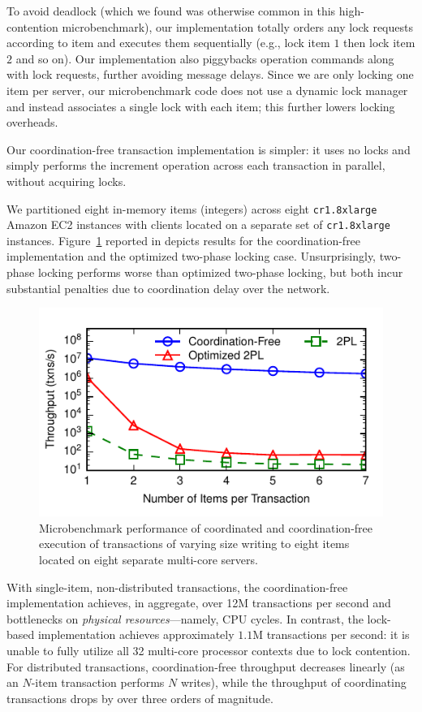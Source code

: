 To avoid deadlock (which we found was otherwise common in this
high-contention microbenchmark), our implementation totally orders any
lock requests according to item and executes them sequentially (e.g.,
lock item $1$ then lock item $2$ and so on). Our implementation also
piggybacks operation commands along with lock requests, further
avoiding message delays. Since we are only locking one item per
server, our microbenchmark code does not use a dynamic lock manager
and instead associates a single lock with each item; this further
lowers locking overheads.

Our coordination-free transaction implementation is simpler: it uses
no locks and simply performs the increment operation across each
transaction in parallel, without acquiring locks.

We partitioned eight in-memory items (integers) across eight
\texttt{cr1.8xlarge} Amazon EC2 instances with clients located on a
separate set of \texttt{cr1.8xlarge}
instances. Figure~\ref{fig:micro-all} reported in depicts results for
the coordination-free implementation and the optimized two-phase
locking case. Unsurprisingly, two-phase locking performs worse than
optimized two-phase locking, but both incur substantial penalties due
to coordination delay over the network.

\begin{figure}
\includegraphics[width=\figscale\columnwidth]{figs/micro_thru_all.pdf}
\caption{Microbenchmark performance of coordinated and
  coordination-free execution of transactions of varying size writing
  to eight items located on eight separate multi-core servers.}
\label{fig:micro-all}
\end{figure}

With single-item, non-distributed transactions, the coordination-free
implementation achieves, in aggregate, over 12M transactions per
second and bottlenecks on \textit{physical resources}---namely, CPU
cycles. In contrast, the lock-based implementation achieves
approximately $1.1$M transactions per second: it is unable to fully
utilize all 32 multi-core processor contexts due to lock contention. For
distributed transactions, coordination-free throughput decreases
linearly (as an $N$-item transaction performs $N$ writes), while the
throughput of coordinating transactions drops by over three orders of
magnitude.

